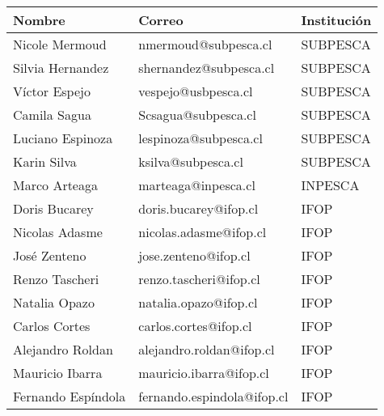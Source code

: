 
\begin{table}[H]
    \centering
    \begin{tabular}{|p{3.5cm}|p{6cm}|p{4cm}|}
        \hline
        \textbf{Nombre} & \textbf{Correo} & \textbf{Institución} \\
        \hline
        Nicole Mermoud &nmermoud@subpesca.cl & SUBPESCA\\
        \hline
        Silvia Hernandez & shernandez@subpesca.cl & SUBPESCA\\
        \hline
        Víctor Espejo & vespejo@usbpesca.cl &  SUBPESCA\\
        \hline
        Camila Sagua & Scsagua@subpesca.cl & SUBPESCA\\
        \hline
        Luciano Espinoza & lespinoza@subpesca.cl & SUBPESCA\\
        \hline
        Karin Silva & ksilva@subpesca.cl & SUBPESCA\\
        \hline
        Marco Arteaga & marteaga@inpesca.cl & INPESCA\\
        \hline
        Doris Bucarey & doris.bucarey@ifop.cl & IFOP\\
        \hline
        Nicolas Adasme & nicolas.adasme@ifop.cl &  IFOP\\
        \hline
        José Zenteno & jose.zenteno@ifop.cl & IFOP\\
        \hline
        Renzo Tascheri & renzo.tascheri@ifop.cl & IFOP\\
        \hline
        Natalia Opazo & natalia.opazo@ifop.cl & IFOP\\
        \hline
        Carlos Cortes & carlos.cortes@ifop.cl &  IFOP\\
        \hline
        Alejandro Roldan & alejandro.roldan@ifop.cl & IFOP\\
        \hline
        Mauricio Ibarra & mauricio.ibarra@ifop.cl & IFOP\\
        \hline
        Fernando Espíndola & fernando.espindola@ifop.cl & IFOP\\
        \hline
    \end{tabular}
\end{table}

